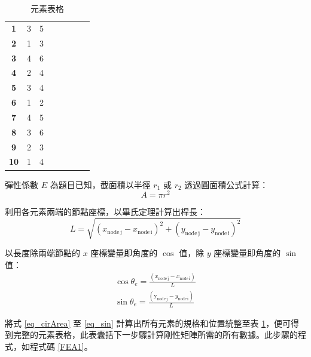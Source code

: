 \documentclass[12pt]{article}
\numberwithin{figure}{section}
\numberwithin{table}{section}
\numberwithin{equation}{section}
\begin{document}
\begin{CJK}{UTF8}{bkai}
\begin{description}
		\begin{table}[h]
		\caption{元素表格}
		\label{elementTable}
		\renewcommand{\arraystretch}{1.1}
		\centering
		\begin{tabular}[c]{cccccccc}
		\hline
		\makebox[1.8cm]{Element} & \makebox[1.3cm]{node $i$} & \makebox[1.3cm]{node $j$} & \makebox[0.5cm]{E}& \makebox[0.5cm]{A}& \makebox[0.7cm]{$L$}& \makebox[0.7cm]{$\cos$}& \makebox[0.7cm]{$\sin$}\\
		\hline
		{\bf1}   & 3   & 5 \\
		{\bf2}   & 1   & 3 \\
		{\bf3}   & 4   & 6 \\
		{\bf4}   & 2   & 4 \\
		{\bf5}   & 3   & 4 \\
		{\bf6}   & 1   & 2 \\
		{\bf7}   & 4   & 5 \\
		{\bf8}   & 3   & 6 \\
		{\bf9}   & 2   & 3 \\
		{\bf10}   & 1   & 4 \\
		\hline
		\end{tabular}
		\end{table}

		彈性係數 $E$ 為題目已知，截面積以半徑 $r_1$ 或 $r_2$ 透過圓面積公式計算：
		\begin{equation}
		    \label{eq_cirArea}
		    A=\pi r^2
		\end{equation}

		利用各元素兩端的節點座標，以畢氏定理計算出桿長：
		\begin{equation}
		    \label{eq_lenth}
		    L=\sqrt{(x_{\mathrm{node\, j}}-x_{\mathrm{node\,i}})^2+(y_{\mathrm{node\,j}}-y_{\mathrm{node\,i}})^2}
		\end{equation}

		以長度除兩端節點的 $x$ 座標變量即角度的 $\cos$ 值，除 $y$ 座標變量即角度的 $\sin$ 值：
		\begin{align}
		\label{eq_cos}
		\cos \theta_e=\frac{(x_{\mathrm{node\,j}}-x_{\mathrm{node\,i}})}{L}\\
		\label{eq_sin}
		\sin \theta_e=\frac{( \mathrm{y_{node\,j}}-y_{ \mathrm{node\,i}})}{L}
		\end{align}

		將式 \ref{eq_cirArea} 至 \ref{eq_sin} 計算出所有元素的規格和位置統整至表 \ref{elementTable}，便可得到完整的元素表格，此表囊括下一步驟計算剛性矩陣所需的所有數據。此步驟的程式，如程式碼 \ref{FEA1}。\\


\end{description}
\end{CJK}
\end{document}
